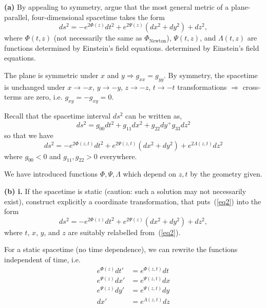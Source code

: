 \documentclass[a4paper]{article} %
\begin{document}
\begin{framed}
\textbf{(a)} By appealing to symmetry, argue that the most general metric of a plane-parallel, four-dimensional spacetime takes the form 
\begin{equation}
ds^2=-e^{2\Phi (z)}dt^2 + e^{2\Psi (z)}(dx^2+dy^2)+dz^2,\label{eq2}
\end{equation}
where $\Phi(t,z)$ (not necessarily the same as $\Phi_{\text{Newton}}$), $\Psi(t,z)$, and $\Lambda(t,z)$ are functions determined by Einstein's field equations.
determined by Einstein’s field equations.
\end{framed}

The plane is symmetric under $x$ and $y \Rightarrow g_{xx}=g_{yy}$. By symmetry, the spacetime is unchanged under $x\to -x$, $y\to -y$, $z\to -z$, $t\to -t$ transformations $\Rightarrow$ cross-terms are zero, i.e. $g_{xy}=-g_{xy}=0$.

Recall that the spacetime interval $ds^2$ can be written as,
\begin{equation}
ds^2=g_{00}dt^2+g_{11}dx^2+g_{22}dy^+g_{33}dz^2
\end{equation}
so that we have
\begin{equation}
ds^2=-e^{2\Phi(z,t)}dt^2+e^{2\Psi(z,t)}(dx^2+dy^2)+e^{2\Lambda (z,t)}dz^2
\end{equation}
where $g_{00}<0$ and $g_{11},g_{22}>0$ everywhere.

We have introduced functions $\Phi, \Psi, \Lambda$ which depend on $z,t$ by the geometry given.

\begin{framed}
\textbf{(b) i.} If the spacetime is static (caution: such a solution may not necessarily exist), construct explicitly a coordinate transformation, that puts~(\ref{eq2}) into the form 
\begin{equation}
ds^2=-e^{2\Phi(z)} dt^2+e^{2\Psi(z)}(dx^2+dy^2)+dz^2,\label{eq3}
\end{equation}
where $t$, $x$, $y$, and $z$ are suitably relabelled from~(\ref{eq2}).
\end{framed}

For a static spacetime (no time dependence), we can rewrite the functions independent of time, i.e.
\begin{align*}
e^{\Phi(z)}dt'&=e^{\Phi(z,t)}dt\\
e^{\Psi(z)}dx'&=e^{\Psi(z,t)}dx\\
e^{\Psi(z)}dy'&=e^{\Psi(z,t)}dy\\
dx'&=e^{\Lambda(z,t)}dz
\end{align*}
\end{document}
